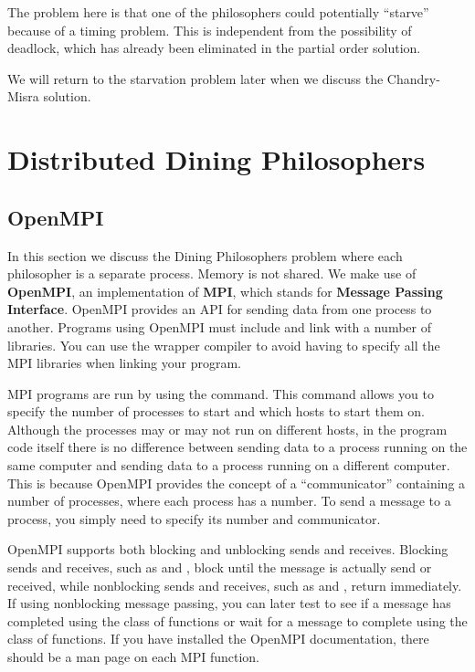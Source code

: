 \documentclass[letterpaper,10pt,openany,oneside]{sphinxmanual}
\begin{document}
The problem here is that one of the philosophers could potentially
``starve'' because of a timing problem. This is independent from the
possibility of deadlock, which has already been eliminated in the
partial order solution.

We will return to the starvation problem later when we discuss the
Chandry-Misra solution.


\chapter{Distributed Dining Philosophers}
\label{Distributed/Distributed:distributed-dining-philosophers}\label{Distributed/Distributed::doc}

\section{OpenMPI}
\label{Distributed/Distributed:openmpi}
In this section we discuss the Dining Philosophers problem where
each philosopher is a separate process. Memory is not shared. We
make use of \textbf{OpenMPI}, an implementation of \textbf{MPI}, which stands
for \textbf{Message Passing Interface}. OpenMPI provides an API for
sending data from one process to another. Programs using OpenMPI
must include  and link with a number of libraries. You can
use the wrapper compiler  to avoid having to specify all
the MPI libraries when linking your program.

MPI programs are run by using the  command. This command
allows you to specify the number of processes to start and which
hosts to start them on. Although the processes may or may not run
on different hosts, in the program code itself there is no
difference between sending data to a process running on the same
computer and sending data to a process running on a different
computer. This is because OpenMPI provides the concept of a
``communicator'' containing a number of processes, where each process
has a number. To send a message to a process, you simply need to
specify its number and communicator.

OpenMPI supports both blocking and unblocking sends and receives.
Blocking sends and receives, such as  and
, block until the message is actually send or
received, while nonblocking sends and receives, such as
 and , return immediately. If using
nonblocking message passing, you can later test to see if a message
has completed using the  class of functions or wait
for a message to complete using the  class of
functions. If you have installed the OpenMPI documentation, there
should be a man page on each MPI function.
\end{document}
